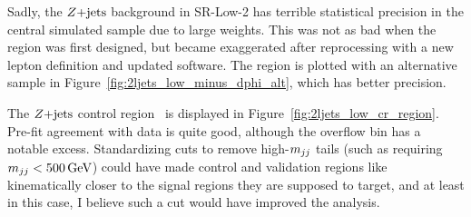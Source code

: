 Sadly, the $\zjets$ background in SR-Low-2 has terrible statistical precision
in the central simulated sample due to large weights.
This was not as bad when the region was first designed, but became exaggerated
after reprocessing with a new lepton definition and updated software.
The region is plotted with an alternative sample in
Figure~\ref{fig:2ljets_low_minus_dphi_alt}, which has better precision.

The $\zjets$ control region \crz\ is displayed in
Figure~\ref{fig:2ljets_low_cr_region}.
Pre-fit agreement with data is quite good, although the overflow bin has a
notable excess.
Standardizing cuts to remove high-$\mjj$ tails (such as requiring
$\mjj < 500\,\eV[G]$) could have made control and validation regions like \crz
kinematically closer to the signal regions they are supposed to target,
and at least in this case, I believe such a cut would have improved the
analysis.

